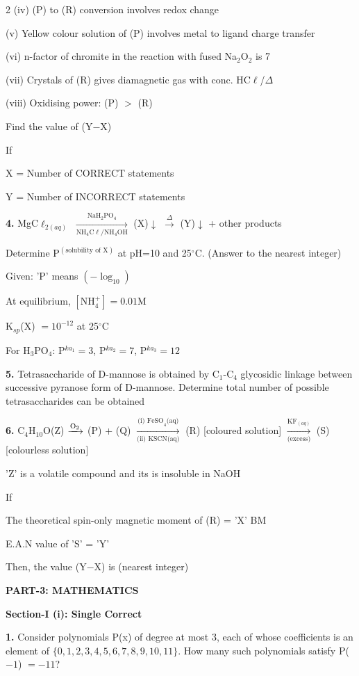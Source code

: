 \documentclass[10pt]{extarticle}
\newcommand{\sectionhdr}[1]{\par\vspace{4pt}\noindent\textbf{\large #1}\par\vspace{2pt}}
\newcommand{\subsectionhdr}[1]{\par\vspace{3pt}\noindent\textbf{#1}\par\vspace{2pt}}
\begin{document}
\begin{multicols}{2}
(iv) (P) to (R) conversion involves redox change

(v) Yellow colour solution of (P) involves metal to ligand charge transfer

(vi) n-factor of chromite in the reaction with fused Na$_2$O$_2$ is 7

(vii) Crystals of (R) gives diamagnetic gas with conc. HC$\ell$/$\Delta$

(viii) Oxidising power: (P) $>$ (R)

Find the value of (Y$-$X)

If

X = Number of CORRECT statements

Y = Number of INCORRECT statements

\textbf{4.} MgC$\ell_{2(aq)}$ $\xrightarrow[\text{NH}_4\text{C}\ell/\text{NH}_4\text{OH}]{\text{NaH}_2\text{PO}_4}$ (X)$\downarrow$ $\xrightarrow\Delta$ (Y)$\downarrow$ + other products 

Determine P$^{(\text{solubility of X})}$ at pH=10 and 25$^\circ$C. (Answer to the nearest integer)

Given: 'P' means $(-\log_{10})$

At equilibrium, $[\text{NH}_4^+]=0.01$M

K$_{sp}$(X) $=10^{-12}$ at 25$^\circ$C

For H$_3$PO$_4$: P$^{ka_1}=3$, P$^{ka_2}=7$, P$^{ka_3}=12$

\textbf{5.} Tetrasaccharide of D-mannose is obtained by C$_1$-C$_4$ glycosidic linkage between successive pyranose form of D-mannose. Determine total number of possible tetrasaccharides can be obtained

\textbf{6.} C$_4$H$_{10}$O(Z) $\xrightarrow{\text O_2}$ (P) + (Q) $\xrightarrow[\text{(ii) KSCN(aq)}]{\text{(i) FeSO}_4\text{(aq)}}$ (R) [coloured solution] $\xrightarrow[\text{(excess)}]{\text{KF}_{(aq)}}$ (S) [colourless solution]

'Z' is a volatile compound and its is insoluble in NaOH

If

The theoretical spin-only magnetic moment of (R) = 'X' BM

E.A.N value of 'S' = 'Y'

Then, the value (Y$-$X) is (nearest integer)

\sectionhdr{PART-3: MATHEMATICS}
\subsectionhdr{Section-I (i): Single Correct}

\textbf{1.} Consider polynomials P(x) of degree at most 3, each of whose coefficients is an element of $\{0,1,2,3,4,5,6,7,8,9,10,11\}$. How many such polynomials satisfy P($-1$) $=-11$?


\end{multicols}
\end{document}
